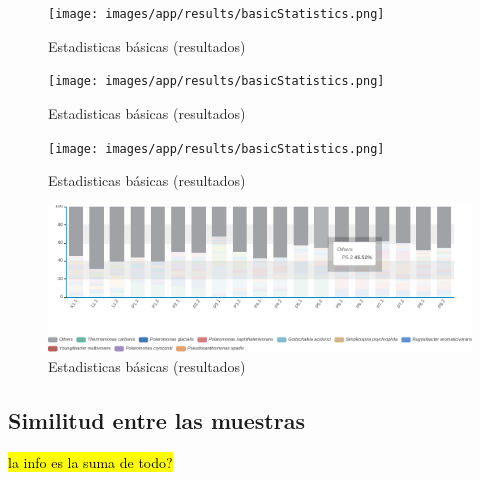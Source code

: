 \begin{figure}[H]
    \texttt{[image: images/app/results/basicStatistics.png]}

    \caption{Estadisticas básicas (resultados)}
    \label{fig:app-results-taxonomicAssig-sample-perc}
\end{figure}

\begin{figure}[H]
    \texttt{[image: images/app/results/basicStatistics.png]}

    \caption{Estadisticas básicas (resultados)}
    \label{fig:app-results-taxonomicAssig-group-nreads}
\end{figure}

\begin{figure}[H]
    \texttt{[image: images/app/results/basicStatistics.png]}

    \caption{Estadisticas básicas (resultados)}
    \label{fig:app-results-taxonomicAssig-group-perc}
\end{figure}


\begin{figure}[H]
    \includegraphics[width=1\linewidth]{images/app/results/taxonomy_others.pdf}

    \caption{Estadisticas básicas (resultados)}
    \label{fig:app-results-taxonomicAssig-others}
\end{figure}
\subsection{Similitud entre las muestras}
\hl{la info es la suma de todo?}


